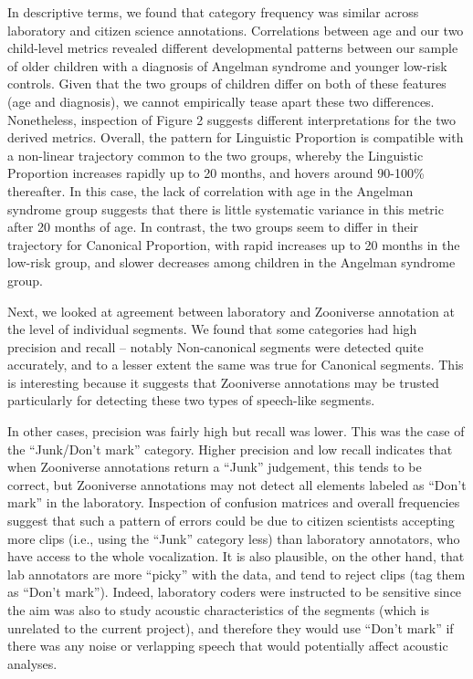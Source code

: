 \documentclass[english,,man,floatsintext]{apa6}
\begin{document}
In descriptive terms, we found that category frequency was similar across laboratory and citizen science annotations. Correlations between age and our two child-level metrics revealed different developmental patterns between our sample of older children with a diagnosis of Angelman syndrome and younger low-risk controls. Given that the two groups of children differ on both of these features (age and diagnosis), we cannot empirically tease apart these two differences. Nonetheless, inspection of Figure 2 suggests different interpretations for the two derived metrics. Overall, the pattern for Linguistic Proportion is compatible with a non-linear trajectory common to the two groups, whereby the Linguistic Proportion increases rapidly up to 20 months, and hovers around 90-100\% thereafter. In this case, the lack of correlation with age in the Angelman syndrome group suggests that there is little systematic variance in this metric after 20 months of age. In contrast, the two groups seem to differ in their trajectory for Canonical Proportion, with rapid increases up to 20 months in the low-risk group, and slower decreases among children in the Angelman syndrome group.

Next, we looked at agreement between laboratory and Zooniverse annotation at the level of individual segments. We found that some categories had high precision and recall -- notably Non-canonical segments were detected quite accurately, and to a lesser extent the same was true for Canonical segments. This is interesting because it suggests that Zooniverse annotations may be trusted particularly for detecting these two types of speech-like segments.

In other cases, precision was fairly high but recall was lower. This was the case of the \enquote{Junk/Don't mark} category. Higher precision and low recall indicates that when Zooniverse annotations return a \enquote{Junk} judgement, this tends to be correct, but Zooniverse annotations may not detect all elements labeled as \enquote{Don't mark} in the laboratory. Inspection of confusion matrices and overall frequencies suggest that such a pattern of errors could be due to citizen scientists accepting more clips (i.e., using the \enquote{Junk} category less) than laboratory annotators, who have access to the whole vocalization. It is also plausible, on the other hand, that lab annotators are more \enquote{picky} with the data, and tend to reject clips (tag them as \enquote{Don't mark}). Indeed, laboratory coders were instructed to be sensitive since the aim was also to study acoustic characteristics of the segments (which is unrelated to the current project), and therefore they would use \enquote{Don't mark} if there was any noise or verlapping speech that would potentially affect acoustic analyses.
\end{document}
